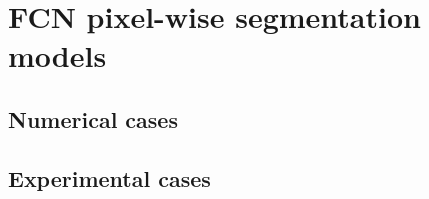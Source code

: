 \section{FCN pixel-wise segmentation models}
\label{sec52}


\subsection{Numerical cases}
\label{sec521}



\subsection{Experimental cases}
\label{sec522}



